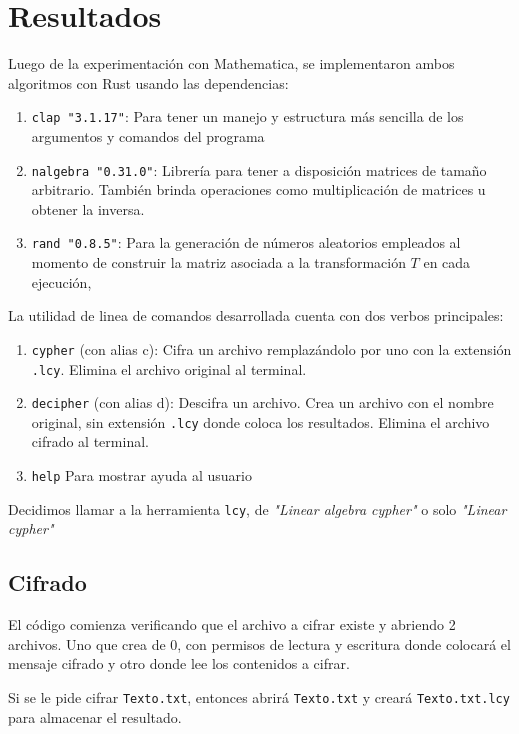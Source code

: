 \documentclass[a4paper]{article}
\begin{document}
\newpage
\section{Resultados}

Luego de la experimentación con Mathematica, se implementaron ambos algoritmos
con Rust usando las dependencias:

\begin{enumerate}
\item \texttt{clap "3.1.17"}: Para tener un manejo y estructura más sencilla de
los argumentos y comandos del programa
\item \texttt{nalgebra "0.31.0"}: Librería para tener a disposición matrices de
tamaño arbitrario. También brinda operaciones como multiplicación de matrices u
obtener la inversa.
\item \texttt{rand "0.8.5"}: Para la generación de números aleatorios empleados
al momento de construir la matriz asociada a la transformación $T$ en cada
ejecución,
\end{enumerate}

La utilidad de linea de comandos desarrollada cuenta con dos verbos principales:

\begin{enumerate}
\item \texttt{cypher} (con alias c): Cifra un archivo remplazándolo por uno con
la extensión \texttt{.lcy}. Elimina el archivo original al terminal.
\item \texttt{decipher} (con alias d): Descifra un archivo. Crea un archivo con
el nombre original, sin extensión \texttt{.lcy} donde coloca los resultados.
Elimina el archivo cifrado al terminal.
    \item \texttt{help} Para mostrar ayuda al usuario
\end{enumerate}

Decidimos llamar a la herramienta \texttt{lcy}, de \textit{"Linear algebra
cypher"} o solo \textit{"Linear cypher"}

\subsection{Cifrado}

El código comienza verificando que el archivo a cifrar existe y abriendo 2
archivos.
Uno
que
crea
de
0,
con
permisos
de
lectura y escritura donde
colocará
el
mensaje
cifrado
y
otro donde lee los contenidos a cifrar.

Si se le pide cifrar \texttt{Texto.txt}, entonces abrirá \texttt{Texto.txt} y
creará \texttt{Texto.txt.lcy} para almacenar el resultado.
\end{document}
